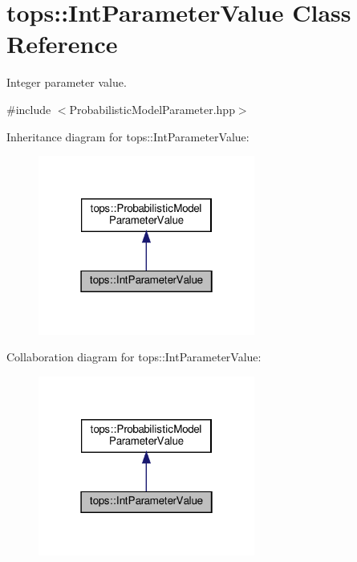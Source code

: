 \hypertarget{classtops_1_1IntParameterValue}{}\section{tops\+:\+:Int\+Parameter\+Value Class Reference}
\label{classtops_1_1IntParameterValue}


Integer parameter value.  




{\ttfamily \#include $<$Probabilistic\+Model\+Parameter.\+hpp$>$}



Inheritance diagram for tops\+:\+:Int\+Parameter\+Value\+:
\nopagebreak
\begin{figure}[H]
\begin{center}
\leavevmode
\includegraphics[width=202pt]{classtops_1_1IntParameterValue__inherit__graph}
\end{center}
\end{figure}


Collaboration diagram for tops\+:\+:Int\+Parameter\+Value\+:
\nopagebreak
\begin{figure}[H]
\begin{center}
\leavevmode
\includegraphics[width=202pt]{classtops_1_1IntParameterValue__coll__graph}
\end{center}
\end{figure}
